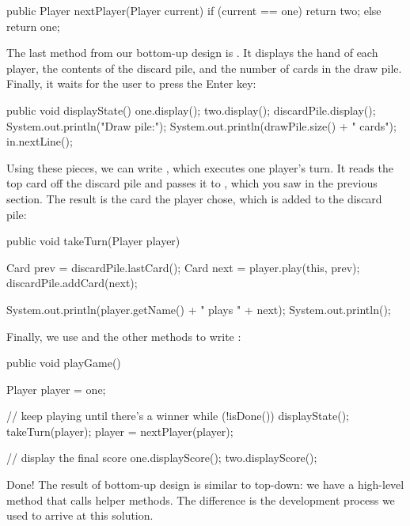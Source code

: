 \begin{code}
public Player nextPlayer(Player current) {
    if (current == one) {
        return two;
    } else {
        return one;
    }
}
\end{code}

The last method from our bottom-up design is .
It displays the hand of each player, the contents of the discard pile, and the number of cards in the draw pile.
Finally, it waits for the user to press the {\sf Enter} key:


\begin{code}
public void displayState() {
    one.display();
    two.display();
    discardPile.display();
    System.out.println("Draw pile:");
    System.out.println(drawPile.size() + " cards");
    in.nextLine();
}
\end{code}

Using these pieces, we can write , which executes one player's turn.
It reads the top card off the discard pile and passes it to , which you saw in the previous section.
The result is the card the player chose, which is added to the discard pile:

\begin{code}
public void takeTurn(Player player) {
    Card prev = discardPile.lastCard();
    Card next = player.play(this, prev);
    discardPile.addCard(next);

    System.out.println(player.getName() + " plays " + next);
    System.out.println();
}
\end{code}

Finally, we use  and the other methods to write :

\begin{code}
public void playGame() {
    Player player = one;

    // keep playing until there's a winner
    while (!isDone()) {
        displayState();
        takeTurn(player);
        player = nextPlayer(player);
    }

    // display the final score
    one.displayScore();
    two.displayScore();
}
\end{code}

Done!
The result of bottom-up design is similar to top-down: we have a high-level method that calls helper methods.
The difference is the development process we used to arrive at this solution.


